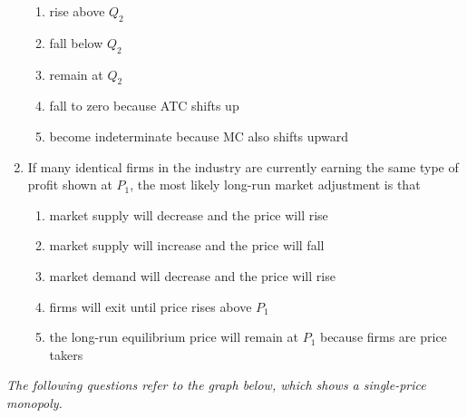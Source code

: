 \documentclass[10pt]{article}
\newenvironment{choiceslist}
  {\begin{enumerate}[label=(\Alph*), leftmargin=1.55em, itemsep=0.1em, topsep=0.15em, parsep=0pt]}
  {\end{enumerate}}
\newenvironment{stimulus}
  {\begin{center}\begin{minipage}{0.97\columnwidth}\footnotesize\itshape\setlength{\tabcolsep}{3pt}\renewcommand{\arraystretch}{0.96}}
  {\end{minipage}\end{center}}
\begin{document}
\begin{multicols*}{2}
\begin{enumerate}[resume*=curveq, leftmargin=*, itemsep=0.8em, topsep=0.18em, parsep=0pt]
\begin{choiceslist}
\item rise above $Q_2$
\item fall below $Q_2$
\item remain at $Q_2$
\item fall to zero because ATC shifts up
\item become indeterminate because MC also shifts upward
\end{choiceslist}
\item If many identical firms in the industry are currently earning the same type of profit shown at $P_1$, the most likely long-run market adjustment is that
\begin{choiceslist}
\item market supply will decrease and the price will rise
\item market supply will increase and the price will fall
\item market demand will decrease and the price will rise
\item firms will exit until price rises above $P_1$
\item the long-run equilibrium price will remain at $P_1$ because firms are price takers
\end{choiceslist}
\end{enumerate}
\begin{stimulus}
The following questions refer to the graph below, which shows a single-price monopoly.


\end{stimulus}
\end{multicols*}
\end{document}
